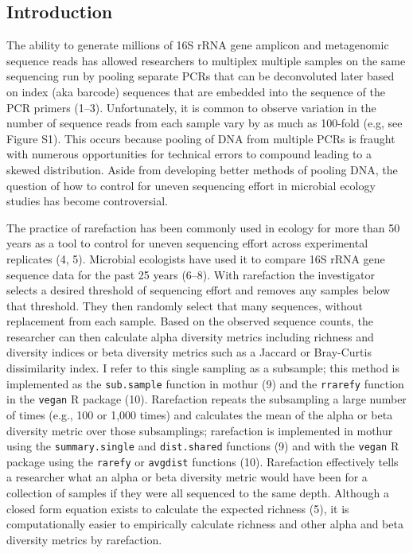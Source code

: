 \documentclass[
]{article}
\begin{document}
\newpage

\hypertarget{introduction}{%
\subsection{Introduction}\label{introduction}}

The ability to generate millions of 16S rRNA gene amplicon and
metagenomic sequence reads has allowed researchers to multiplex multiple
samples on the same sequencing run by pooling separate PCRs that can be
deconvoluted later based on index (aka barcode) sequences that are
embedded into the sequence of the PCR primers (1--3). Unfortunately, it
is common to observe variation in the number of sequence reads from each
sample vary by as much as 100-fold (e.g, see Figure S1). This occurs
because pooling of DNA from multiple PCRs is fraught with numerous
opportunities for technical errors to compound leading to a skewed
distribution. Aside from developing better methods of pooling DNA, the
question of how to control for uneven sequencing effort in microbial
ecology studies has become controversial.

The practice of rarefaction has been commonly used in ecology for more
than 50 years as a tool to control for uneven sequencing effort across
experimental replicates (4, 5). Microbial ecologists have used it to
compare 16S rRNA gene sequence data for the past 25 years (6--8). With
rarefaction the investigator selects a desired threshold of sequencing
effort and removes any samples below that threshold. They then randomly
select that many sequences, without replacement from each sample. Based
on the observed sequence counts, the researcher can then calculate alpha
diversity metrics including richness and diversity indices or beta
diversity metrics such as a Jaccard or Bray-Curtis dissimilarity index.
I refer to this single sampling as a subsample; this method is
implemented as the \texttt{sub.sample} function in mothur (9) and the
\texttt{rrarefy} function in the \texttt{vegan} R package (10).
Rarefaction repeats the subsampling a large number of times (e.g., 100
or 1,000 times) and calculates the mean of the alpha or beta diversity
metric over those subsamplings; rarefaction is implemented in mothur
using the \texttt{summary.single} and \texttt{dist.shared} functions (9)
and with the \texttt{vegan} R package using the \texttt{rarefy} or
\texttt{avgdist} functions (10). Rarefaction effectively tells a
researcher what an alpha or beta diversity metric would have been for a
collection of samples if they were all sequenced to the same depth.
Although a closed form equation exists to calculate the expected
richness (5), it is computationally easier to empirically calculate
richness and other alpha and beta diversity metrics by rarefaction.
\end{document}
